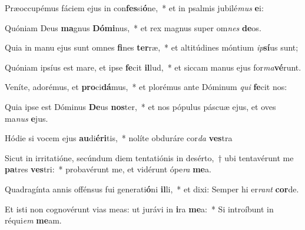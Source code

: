 \item Præoccupémus fáciem ejus in con\textbf{fes}si\textbf{ó}ne,~* et in psalmis jubilé\textit{mus} \textbf{e}i:
\item Quóniam Deus \textbf{ma}gnus \textbf{Dó}\textbf{mi}nus,~* et rex magnus super om\textit{nes} \textbf{de}os.
\item Quia in manu ejus sunt omnes \textbf{fi}nes \textbf{ter}ræ,~* et altitúdines móntium \textit{ip}\textbf{sí}us sunt;
\item Quóniam ipsíus est mare, et ipse \textbf{fe}cit \textbf{il}lud,~* et siccam manus ejus for\textit{ma}\textbf{vé}runt.
\item Veníte, adorémus, et \textbf{pro}ci\textbf{dá}mus,~* et plorémus ante Dóminum \textit{qui} \textbf{fe}cit nos:
\item Quia ipse est Dóminus \textbf{De}us \textbf{nos}ter,~* et nos pópulus páscuæ ejus, et oves ma\textit{nus} \textbf{e}jus.
\item Hódie si vocem ejus \textbf{au}di\textbf{é}\textbf{ri}tis,~* nolíte obduráre cor\textit{da} \textbf{ves}tra
\item Sicut in irritatióne, secúndum diem tentatiónis in desérto,~† ubi tentavérunt me \textbf{pa}tres \textbf{ves}tri:~* probavérunt me, et vidérunt ópe\textit{ra} \textbf{me}a.
\item Quadragínta annis offénsus fui generati\textbf{ó}ni \textbf{il}li,~* et dixi: Semper hi er\textit{rant} \textbf{cor}de.
\item Et isti non cognovérunt vias meas: ut jurávi in \textbf{i}ra \textbf{me}a:~* Si introíbunt in réqui\textit{em} \textbf{me}am.
